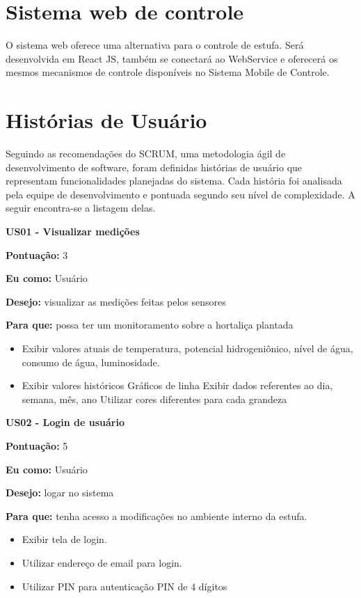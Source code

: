 \section{Sistema web de controle}

O sistema web oferece uma alternativa para o controle de estufa. Será desenvolvida em React JS, também se conectará ao WebService e oferecerá os mesmos mecanismos de controle disponíveis no Sistema Mobile de Controle.

\section{Histórias de Usuário}

Seguindo as recomendações do SCRUM, uma metodologia ágil de desenvolvimento de software, foram definidas histórias de usuário que representam funcionalidades planejadas do sistema. Cada história foi analisada pela equipe de desenvolvimento e pontuada segundo seu nível de complexidade. A seguir encontra-se a listagem delas. 

\textbf{US01 - Visualizar medições}

\textbf{Pontuação:} 3

\textbf{Eu como:} Usuário

\textbf{Desejo:} visualizar as medições feitas pelos sensores

\textbf{Para que:} possa ter um monitoramento sobre a hortaliça plantada

\begin{itemize}
	\item Exibir valores atuais de temperatura, potencial hidrogeniônico, nível de água, consumo de água, luminosidade.
	\item Exibir valores históricos
		\subitem Gráficos de linha
		\subitem Exibir dados referentes ao dia, semana, mês, ano
		\subitem Utilizar cores diferentes para cada grandeza
\end{itemize}

\textbf{US02 - Login de usuário}

\textbf{Pontuação:} 5

\textbf{Eu como:} Usuário

\textbf{Desejo:} logar no sistema

\textbf{Para que:} tenha acesso a modificações no ambiente interno da estufa.

\begin{itemize}
	\item Exibir tela de login.
	\item Utilizar endereço de email para login.
	\item Utilizar PIN para autenticação
		\subitem PIN de 4 dígitos
\end{itemize}

